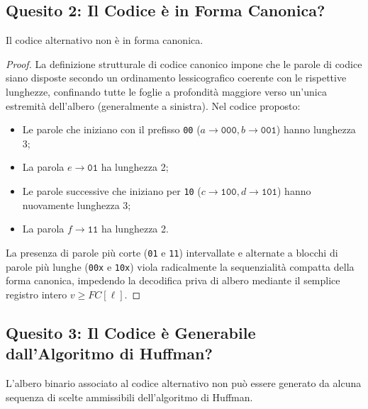 \FloatBarrier
\subsection{Quesito 2: Il Codice \`e in Forma Canonica?}
\label{subsec:quesito-2-forma-canonica}

\begin{proposition}
Il codice alternativo non \`e in forma canonica.
\end{proposition}

\begin{proof}
La definizione strutturale di codice canonico impone che le parole di codice siano disposte secondo un ordinamento lessicografico coerente con le rispettive lunghezze, confinando tutte le foglie a profondit\`a maggiore verso un'unica estremit\`a dell'albero (generalmente a sinistra).
Nel codice proposto:
\begin{itemize}
  \item Le parole che iniziano con il prefisso \texttt{00} ($a \to \texttt{000}, b \to \texttt{001}$) hanno lunghezza 3;
  \item La parola $e \to \texttt{01}$ ha lunghezza 2;
  \item Le parole successive che iniziano per \texttt{10} ($c \to \texttt{100}, d \to \texttt{101}$) hanno nuovamente lunghezza 3;
  \item La parola $f \to \texttt{11}$ ha lunghezza 2.
\end{itemize}
La presenza di parole pi\`u corte (\texttt{01} e \texttt{11}) intervallate e alternate a blocchi di parole pi\`u lunghe (\texttt{00x} e \texttt{10x}) viola radicalmente la sequenzialit\`a compatta della forma canonica, impedendo la decodifica priva di albero mediante il semplice registro intero $v \ge FC[\ell]$.
\end{proof}

\FloatBarrier
\subsection{Quesito 3: Il Codice \`e Generabile dall'Algoritmo di Huffman?}
\label{subsec:quesito-3-generabilita-huffman}

\begin{theorem}
L'albero binario associato al codice alternativo non pu\`o essere generato da alcuna sequenza di scelte ammissibili dell'algoritmo di Huffman.
\end{theorem}

